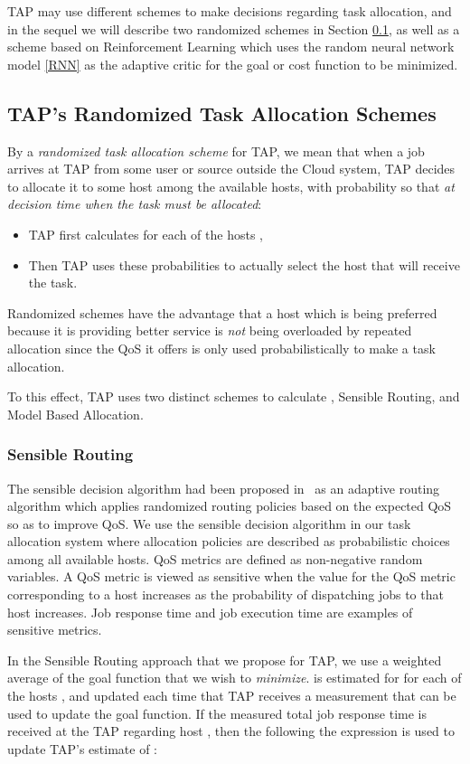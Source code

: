 \documentclass[journal]{IEEEtran}
\begin{document}
TAP may use different schemes to make decisions regarding task allocation, and in the sequel we will describe two randomized schemes in Section \ref{random}, as well as a scheme based on Reinforcement Learning \cite{Sutton} which uses the random neural network model \ref{RNN} as the adaptive critic for the goal or cost function to be minimized.


\subsection{TAP's Randomized Task Allocation Schemes} \label{random}

By a {\em randomized task allocation scheme} for TAP, we mean that when a job arrives at TAP from some user or source outside the Cloud system, TAP decides to allocate it to some host  among the 
available hosts, with probability  so
that {\em at decision time when the task must be allocated}:
\begin{itemize}
\item TAP first calculates  for each of the hosts ,
\item Then TAP uses these probabilities to actually select the host that will receive the task.
\end{itemize}
Randomized schemes have the advantage that a host which is being preferred because it is providing better service is {\em not} being overloaded by repeated allocation since the QoS it offers is
only used probabilistically to make a task allocation.

To this effect, TAP uses two distinct schemes to calculate , Sensible Routing, and Model Based Allocation.
\subsubsection{Sensible Routing}
The sensible decision algorithm had been proposed in~\cite{gelenbe2003sensible} as an adaptive routing algorithm which applies randomized routing policies based on the expected QoS so as to improve QoS. We use the sensible decision algorithm in our task allocation system where allocation policies are described as probabilistic choices among all available hosts. QoS metrics are defined as non-negative random variables. A QoS metric is viewed as sensitive when the value for the QoS metric corresponding to a host increases as the probability of dispatching jobs to that host increases. Job response time and job execution time are examples of sensitive metrics.
 
 In the Sensible Routing approach that we propose for TAP,  we use a weighted average  of the goal function that we wish to {\em minimize}.  is  estimated for
for each of the hosts , and updated each time  that TAP receives a measurement that can be used to update the goal function. If the measured total job response time 
is received at the TAP regarding host , then the following the expression is used to update TAP's estimate of :
\end{document}
